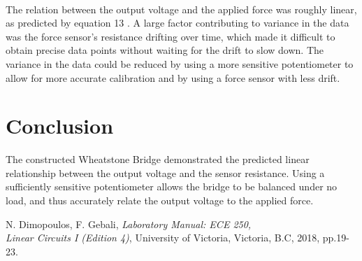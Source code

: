 \documentclass[12pt]{article}
\begin{document}
\paragraph*{}
The relation between the output voltage and the applied force was roughly linear, as predicted by equation 13 \cite{labManual}.
A large factor contributing to variance in the data was the force sensor's resistance drifting over time, which made it difficult to obtain precise data points without waiting for the drift to slow down.
The variance in the data could be reduced by using a more sensitive potentiometer to allow for more accurate calibration and by using a force sensor with less drift.

\section{Conclusion}
The constructed Wheatstone Bridge demonstrated the predicted linear relationship between the output voltage and the sensor resistance.
Using a sufficiently sensitive potentiometer allows the bridge to be balanced under no load, and thus accurately relate the output voltage to the applied force.


\newpage
{}
\begin{thebibliography}{1}
    N. Dimopoulos, F. Gebali, \textit{Laboratory Manual: ECE 250, \\ Linear Circuits I (Edition 4)}, University of Victoria, Victoria, B.C, 2018, pp.19-23.
\end{thebibliography}
\end{document}

